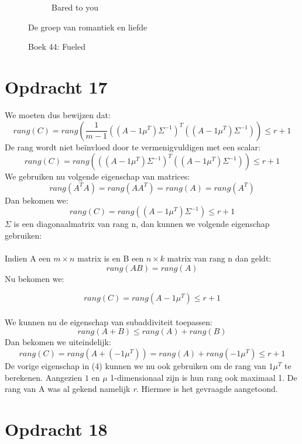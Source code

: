 \documentclass[11pt,a4paper]{article}
\begin{document}
\begin{figure}[H]
\begin{subfigure}{0.33\textwidth}
\caption{Bared to you}
\end{subfigure}
\caption{De groep van romantiek en liefde}

\caption{Boek 44: Fueled}
\end{figure}



\section*{Opdracht 17}

We moeten dus bewijzen dat:
$$ rang(C) = rang\left(\frac{1}{m-1}((A-1\mu^T)\Sigma^{-1})^T((A-1\mu^T)\Sigma^{-1})\right) \leq r + 1$$
De rang wordt niet beïnvloed door te vermenigvuldigen met een scalar:
$$ rang(C) = rang\left(((A-1\mu^T)\Sigma^{-1})^T((A-1\mu^T)\Sigma^{-1})\right) \leq r + 1$$
We gebruiken nu volgende eigenschap van matrices:
\begin{equation}
rang(A^TA) = rang(AA^T) = rang(A) = rang(A^T)
\end{equation}
Dan bekomen we:
$$ rang(C) = rang\left((A-1\mu^T)\Sigma^{-1}\right) \leq r + 1$$
$\Sigma$ is een diagonaalmatrix van rang n, dan kunnen we volgende eigenschap gebruiken:
\\
\\
Indien A een $m\times n$ matrix is en B een $n\times k$ matrix van rang n dan geldt:
\begin{equation}
rang(AB) = rang(A)
\end{equation}
Nu bekomen we:

$$ rang(C) = rang\left(A-1\mu^T\right) \leq r + 1$$
\\
We kunnen nu de eigenschap van subaddiviteit toepassen:
\begin{equation}
rang(A+B) \leq rang(A) + rang(B)
\end{equation} 
Dan bekomen we uiteindelijk:
$$  rang(C) = rang\left(A+(-1\mu^T)\right) = rang(A) + rang(-1\mu^T) \leq r + 1$$
De vorige eigenschap in (4) kunnen we nu ook gebruiken om de rang van $1\mu^T$ te berekenen. Aangezien $1$ en $\mu$ 1-dimensionaal zijn is hun rang ook maximaal 1. De rang van A was al gekend namelijk \textit{r}. Hiermee is het gevraagde aangetoond.

\section*{Opdracht 18}
\end{document}
